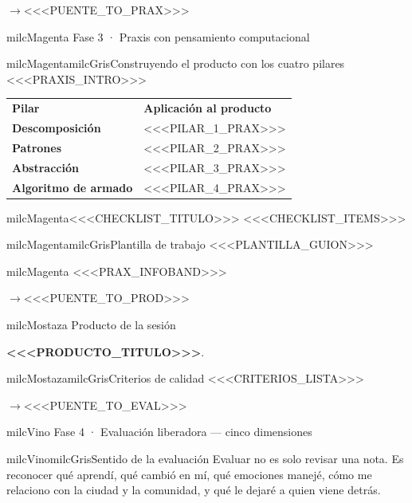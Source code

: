\documentclass[11pt,letterpaper]{article}
\newcommand{\puente}[1]{%
  \begin{puentebox}%
    \textcolor{milcGradeDark}{$\rightarrow$}\hspace{2mm}#1%
  \end{puentebox}%
}
\begin{document}
\puente{<<<PUENTE_TO_PRAX>>>}

\begin{titlebox}{milcMagenta}
Fase 3 · Praxis con pensamiento computacional
\end{titlebox}

\begin{softbox}{milcMagenta}{milcGris}{Construyendo el producto con los cuatro pilares}
<<<PRAXIS_INTRO>>>
\end{softbox}

\small
\begin{tabularx}{\textwidth}{>{\bfseries\RaggedRight\arraybackslash}p{3.6cm}Y}
\color{white}Pilar & \color{white}\bfseries Aplicación al producto\\
Descomposición & <<<PILAR_1_PRAX>>>\\
Patrones & <<<PILAR_2_PRAX>>>\\
Abstracción & <<<PILAR_3_PRAX>>>\\
Algoritmo de armado & <<<PILAR_4_PRAX>>>\\
\end{tabularx}
\normalsize

\begin{drawbox}{milcMagenta}{<<<CHECKLIST_TITULO>>>}
<<<CHECKLIST_ITEMS>>>
\end{drawbox}

\begin{softbox}{milcMagenta}{milcGris}{Plantilla de trabajo}
<<<PLANTILLA_GUION>>>
\end{softbox}

\begin{infoband}{milcMagenta}
<<<PRAX_INFOBAND>>>
\end{infoband}

\puente{<<<PUENTE_TO_PROD>>>}

\begin{titlebox}{milcMostaza}
Producto de la sesión
\end{titlebox}
\textbf{<<<PRODUCTO_TITULO>>>}.
\begin{softbox}{milcMostaza}{milcGris}{Criterios de calidad}
<<<CRITERIOS_LISTA>>>
\end{softbox}

\puente{<<<PUENTE_TO_EVAL>>>}

\begin{titlebox}{milcVino}
Fase 4 · Evaluación liberadora — cinco dimensiones
\end{titlebox}

\begin{softbox}{milcVino}{milcGris}{Sentido de la evaluación}
Evaluar no es solo revisar una nota. Es reconocer qué aprendí, qué cambió en mí, qué emociones manejé, cómo me relaciono con la ciudad y la comunidad, y qué le dejaré a quien viene detrás.
\end{softbox}
\end{document}
